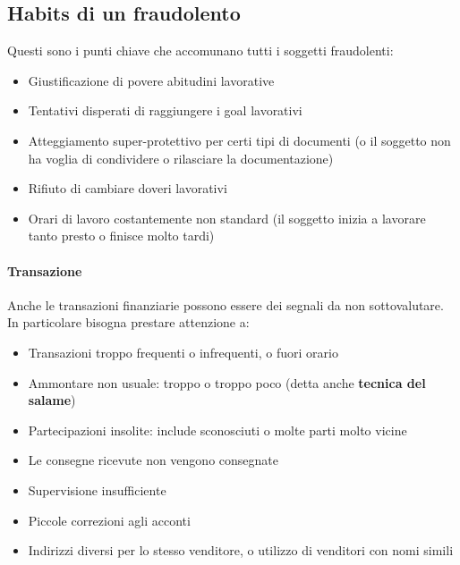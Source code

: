 \subsection{Habits di un fraudolento}

Questi sono i punti chiave che accomunano tutti i soggetti fraudolenti:
\begin{itemize}
  \item Giustificazione di povere abitudini lavorative
  \item Tentativi disperati di raggiungere i goal lavorativi
  \item Atteggiamento super-protettivo per certi tipi di documenti (o il 
  soggetto non ha voglia di condividere o rilasciare la documentazione)
  \item Rifiuto di cambiare doveri lavorativi
  \item Orari di lavoro costantemente non standard (il soggetto inizia a 
  lavorare tanto presto o finisce molto tardi)
\end{itemize}

\paragraph*{Transazione}Anche le transazioni finanziarie possono essere dei 
segnali da non sottovalutare. In particolare bisogna prestare attenzione a:
\begin{itemize}
  \item Transazioni troppo frequenti o infrequenti, o fuori orario
  \item Ammontare non usuale: troppo o troppo poco (detta anche
  \textbf{tecnica del salame})
  \item Partecipazioni insolite: include sconosciuti o molte parti molto vicine
  \item Le consegne ricevute non vengono consegnate
  \item Supervisione insufficiente
  \item Piccole correzioni agli acconti
  \item Indirizzi diversi per lo stesso venditore, o utilizzo di venditori con 
  nomi simili
\end{itemize}
